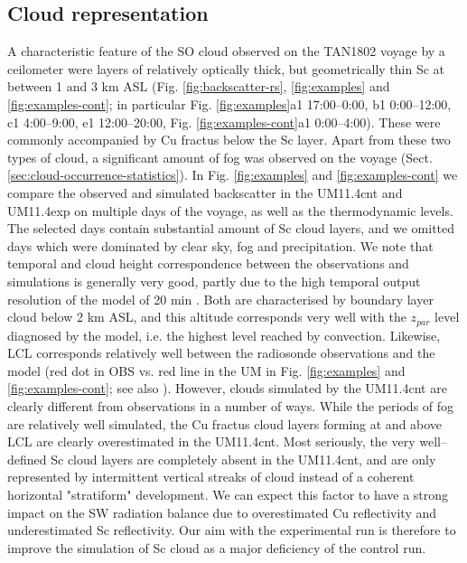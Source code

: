 \subsection{Cloud representation}
\label{sec:cloud-representation}

A characteristic feature of the SO cloud observed on the TAN1802 voyage
by a ceilometer
were layers of relatively optically thick, but geometrically thin Sc
at between 1 and 3 km ASL (Fig. \ref{fig:backscatter-rs}, \ref{fig:examples}
and
\ref{fig:examples-cont}; in particular Fig. \ref{fig:examples}a1 17:00--0:00, b1 0:00--12:00, c1
4:00--9:00, e1 12:00--20:00, Fig. \ref{fig:examples-cont}a1 0:00--4:00).
These were commonly accompanied by Cu fractus
below the Sc layer. 
Apart from these two types of cloud, a significant amount
of fog was observed on the voyage (Sect. \ref{sec:cloud-occurrence-statistics}).
In Fig. \ref{fig:examples} and \ref{fig:examples-cont} we compare the
observed and simulated backscatter in the UM11.4cnt and UM11.4exp on
multiple days of the voyage, as well as the thermodynamic levels.
The selected days contain substantial amount of Sc cloud layers,
and we omitted days which were dominated by clear sky, fog and precipitation.
We note that
temporal and cloud height correspondence between the observations and simulations
is generally very good, partly due to the high temporal output resolution of
the model of 20 min \citep{kuma2020b}. Both are characterised by boundary
layer cloud below 2 km ASL, and this altitude corresponds very well with
the $z_{par}$ level diagnosed by the model, i.e. the highest level reached
by convection. Likewise, LCL corresponds relatively well between the
radiosonde observations and the model (red dot in OBS vs. red line in the UM
in Fig. \ref{fig:examples} and \ref{fig:examples-cont}; see also \cite{kuma2020a}).
However, clouds simulated by the
UM11.4cnt are clearly different from observations in a number of ways.
While the periods of fog are relatively well simulated, the Cu fractus
cloud layers forming at and above LCL are clearly overestimated in the
UM11.4cnt. Most seriously, the very well--defined Sc cloud layers are
completely absent in the UM11.4cnt, and are only represented by
intermittent vertical streaks of cloud instead of a coherent horizontal 
"stratiform" development. We can expect this factor to have a strong
impact on the SW radiation balance due to overestimated Cu reflectivity
and underestimated Sc reflectivity. Our aim with the experimental run is
therefore to improve
the simulation of Sc cloud as a major deficiency of the control run.

